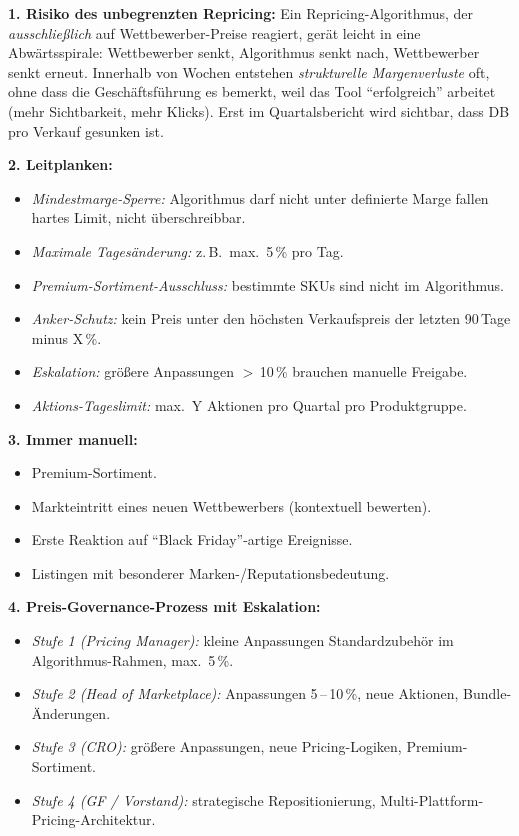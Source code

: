 \documentclass[11pt,a4paper,oneside]{article}
\begin{document}
\begin{loesungbox}
\textbf{1. Risiko des unbegrenzten Repricing:}
Ein Repricing-Algorithmus, der \emph{ausschließlich} auf Wettbewerber-Preise reagiert, gerät leicht in eine Abwärtsspirale: Wettbewerber senkt, Algorithmus senkt nach, Wettbewerber senkt erneut. Innerhalb von Wochen entstehen \emph{strukturelle Margenverluste} \textendash{} oft, ohne dass die Geschäftsführung es bemerkt, weil das Tool ``erfolgreich'' arbeitet (mehr Sichtbarkeit, mehr Klicks). Erst im Quartalsbericht wird sichtbar, dass DB pro Verkauf gesunken ist.

\textbf{2. Leitplanken:}
\begin{itemize}
  \item \emph{Mindestmarge-Sperre:} Algorithmus darf nicht unter definierte Marge fallen \textendash{} hartes Limit, nicht überschreibbar.
  \item \emph{Maximale Tagesänderung:} z.\,B.\ max.\ 5\,\% pro Tag.
  \item \emph{Premium-Sortiment-Ausschluss:} bestimmte SKUs sind nicht im Algorithmus.
  \item \emph{Anker-Schutz:} kein Preis unter den höchsten Verkaufspreis der letzten 90\,Tage minus X\,\%.
  \item \emph{Eskalation:} größere Anpassungen $>$\,10\,\% brauchen manuelle Freigabe.
  \item \emph{Aktions-Tageslimit:} max.\ Y Aktionen pro Quartal pro Produktgruppe.
\end{itemize}

\textbf{3. Immer manuell:}
\begin{itemize}
  \item Premium-Sortiment.
  \item Markteintritt eines neuen Wettbewerbers (kontextuell bewerten).
  \item Erste Reaktion auf ``Black Friday''-artige Ereignisse.
  \item Listingen mit besonderer Marken-/Reputationsbedeutung.
\end{itemize}

\textbf{4. Preis-Governance-Prozess mit Eskalation:}
\begin{itemize}
  \item \emph{Stufe 1 (Pricing Manager):} kleine Anpassungen Standardzubehör im Algorithmus-Rahmen, max.\ 5\,\%.
  \item \emph{Stufe 2 (Head of Marketplace):} Anpassungen 5\,--\,10\,\%, neue Aktionen, Bundle-Änderungen.
  \item \emph{Stufe 3 (CRO):} größere Anpassungen, neue Pricing-Logiken, Premium-Sortiment.
  \item \emph{Stufe 4 (GF / Vorstand):} strategische Repositionierung, Multi-Plattform-Pricing-Architektur.
\end{itemize}


\end{loesungbox}
\end{document}
